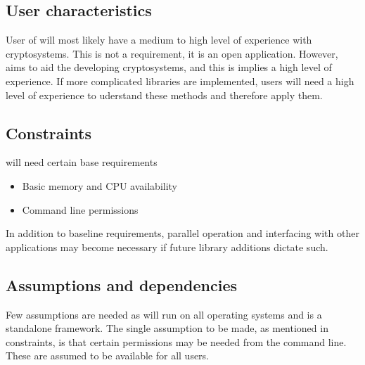 
\subsection{User characteristics}

User of \cry{} will most likely have a medium to high level of experience with cryptosystems. This is not a requirement,
it is an open application. However, \cry{} aims to aid the developing cryptosystems, and this is implies a high level of experience.
If more complicated libraries are implemented, users will need a high level of experience to uderstand these methods and therefore apply
them.


\subsection{Constraints}

\cry{} will need certain base requirements
\begin{itemize}
  \item Basic memory and CPU availability
  \item Command line permissions
\end{itemize}

In addition to baseline requirements, parallel operation and interfacing with other applications may become necessary if
future library additions dictate such.


\subsection{Assumptions and dependencies}

Few assumptions are needed as \cry{} will run on all operating systems and is a standalone framework. The single assumption to be
made, as mentioned in constraints, is that certain permissions may be needed from the command line. These are assumed to be available for all users.

